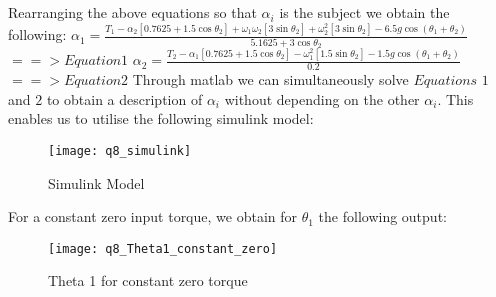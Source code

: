 	\subsection{}
	Rearranging the above equations so that $\alpha _{i}$ is the subject we obtain the following:\newline\newline
	$ \alpha _{1} = \frac{T_{1} - \alpha _{2}[0.7625 + 1.5\cos \theta _{2}] + \omega _{1}\omega _{2}[3\sin \theta _{2}] + \omega^2 _{2}[3\sin \theta _{2}] - 6.5g\cos (\theta _{1} + \theta _{2})}{5.1625 + 3\cos \theta _{2}} $\newline 
	\hspace{20mm}$==> Equation 1$\newline\newline
	$ \alpha _{2} = \frac{T_{2} - \alpha _{1}[0.7625 + 1.5\cos \theta _{2}] - \omega^2 _{1}[1.5\sin \theta _{2}] - 1.5g\cos (\theta _{1} + \theta _{2})}{0.2} $\newline 
	\hspace{20mm}$==> Equation 2$\newline\newline
	\newline
	Through matlab we can simultaneously solve $Equations$ $1$ and $2$ to obtain a description of $\alpha _{i}$ without depending on the other $\alpha _{i}$.\newline
	This enables us to utilise the following simulink model:\newline
	\begin{figure}[position = here]
		\begin{centering}
			\texttt{[image: q8\_simulink]}\\
			\caption [WSpace]{Simulink Model}
		\end{centering}
	\end{figure}
	\newline
	\pagebreak
	For a constant zero input torque, we obtain for $\theta _{1}$ the following output:\newline
	\begin{figure}[position = here]
		\begin{centering}
			\texttt{[image: q8\_Theta1\_constant\_zero]}\\
			\caption [WSpace]{Theta 1 for constant zero torque}
		\end{centering}
	\end{figure}
	
